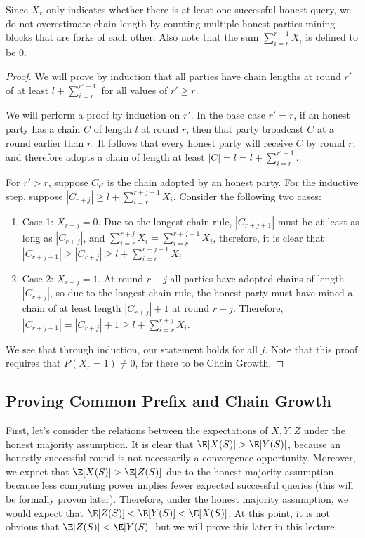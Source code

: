 Since $X_r$ only indicates whether there is at least one successful honest query, we do not overestimate chain length by counting multiple honest parties mining blocks that are forks of each other.
Also note that the sum $\sum_{i=r}^{r-1} X_i$ is defined to be $0$.

\begin {proof}
We will prove by induction that all parties have chain lengths at round $r'$ of at least $l + \sum_{i=r}^{r'-1}$ for all values of $r' \geq r$.

We will perform a proof by induction on $r'$. In the base case $r'=r$,
if an honest party has a chain $C$ of length $l$ at round $r$, then that party broadcast $C$ at a round earlier than $r$. It follows that every honest party will receive $C$ by round $r$, and therefore adopts a chain of length at least
$|C| = l = l + \sum_{i=r}^{r'-1}$.

For $r'>r$, suppose $C_{r'}$ is the chain adopted by an honest party.
For the inductive step, suppose $|C_{r+j}| \geq l + \sum_{i=r}^{r+j-1} X_i$. Consider the following two cases:
\begin{enumerate}
\item Case 1: $X_{r+j} = 0$. Due to the longest chain rule, $|C_{r + j + 1}|$ must be at least as long as $|C_{r+j}|$, and $\sum_{i=r}^{r+j} X_i = \sum_{i=r}^{r+j - 1} X_i$, therefore, it is clear that $|C_{r+j+1}| \geq |C_{r+j}| \geq l + \sum_{i=r}^{r + j + 1} X_i$
\item Case 2: $X_{r+j} = 1$. At round $r + j$ all parties have adopted chains of length $|C_{r+j}|$, so due to the longest chain rule, the honest party must have mined a chain of at least length $|C_{r+j}| + 1$ at round $r + j$. Therefore, $|C_{r + j + 1}| = |C_{r + j}| + 1 \geq l + \sum_{i=r}^{r + j} X_i$.
\end{enumerate}
We see that through induction, our statement holds for all $j$.
Note that this proof requires that $P(X_r = 1) \not = 0$, for there to be Chain Growth.

\end {proof}
\subsection{Proving Common Prefix and Chain Growth}

First, let's consider the relations between the expectations of $X, Y, Z$ under the honest majority assumption. It is clear that $\E[X(S)] > \E[Y(S)]$, because an honestly successful round is not necessarily a convergence opportunity. Moreover, we expect that $\E[X(S)] > \E[Z(S)]$ due to the honest majority assumption because less computing power implies fewer expected successful queries (this will be formally proven later). Therefore, under the honest majority assumption, we would expect that $\E[Z(S)] < \E[Y(S)] < \E[X(S)]$.
At this point, it is not obvious that $\E[Z(S)] < \E[Y(S)]$ but we will prove this later in this lecture.

